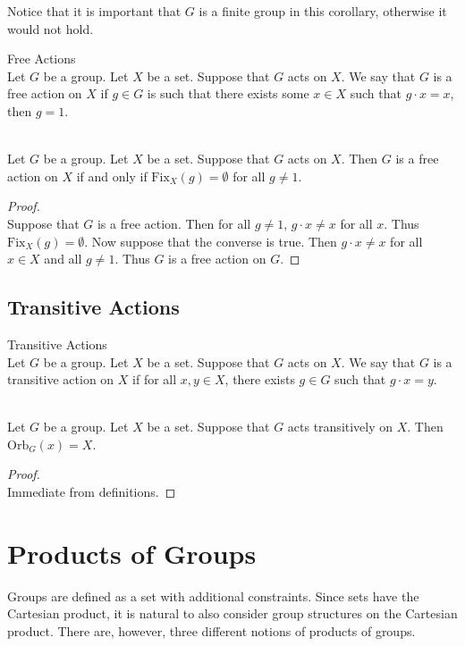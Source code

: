 \documentclass[a4paper]{article}
\begin{document}
Notice that it is important that $G$ is a finite group in this corollary, otherwise it would not hold. 

\begin{defn}{Free Actions}{}\\
Let $G$ be a group. Let $X$ be a set. Suppose that $G$ acts on $X$. We say that $G$ is a free action on $X$ if $g\in G$ is such that there exists some $x\in X$ such that $g\cdot x=x$, then $g=1$. 
\end{defn}

\begin{lmm}{}{}\\
Let $G$ be a group. Let $X$ be a set. Suppose that $G$ acts on $X$. Then $G$ is a free action on $X$ if and only if $\text{Fix}_X(g)=\emptyset$ for all $g\neq 1$. 
\begin{proof}\\
Suppose that $G$ is a free action. Then for all $g\neq 1$, $g\cdot x\neq x$ for all $x$. Thus $\text{Fix}_X(g)=\emptyset$. Now suppose that the converse is true. Then $g\cdot x\neq x$ for all $x\in X$ and all $g\neq 1$. Thus $G$ is a free action on $G$. 
\end{proof}
\end{lmm}

\subsection{Transitive Actions}
\begin{defn}{Transitive Actions}{}\\
Let $G$ be a group. Let $X$ be a set. Suppose that $G$ acts on $X$. We say that $G$ is a transitive action on $X$ if for all $x,y\in X$, there exists $g\in G$ such that $g\cdot x=y$. 
\end{defn}

\begin{lmm}{}{}\\
Let $G$ be a group. Let $X$ be a set. Suppose that $G$ acts transitively on $X$. Then $\text{Orb}_G(x)=X$. 
\begin{proof}\\
Immediate from definitions. 
\end{proof}
\end{lmm}

\pagebreak
\section{Products of Groups}
Groups are defined as a set with additional constraints. Since sets have the Cartesian product, it is natural to also consider group structures on the Cartesian product. There are, however, three different notions of products of groups. 
\end{document}
